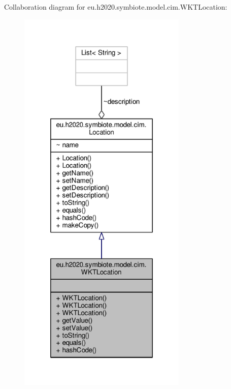 Collaboration diagram for eu.\+h2020.\+symbiote.\+model.\+cim.\+W\+K\+T\+Location\+:
\nopagebreak
\begin{figure}[H]
\begin{center}
\leavevmode
\includegraphics[width=228pt]{classeu_1_1h2020_1_1symbiote_1_1model_1_1cim_1_1WKTLocation__coll__graph}
\end{center}
\end{figure}
